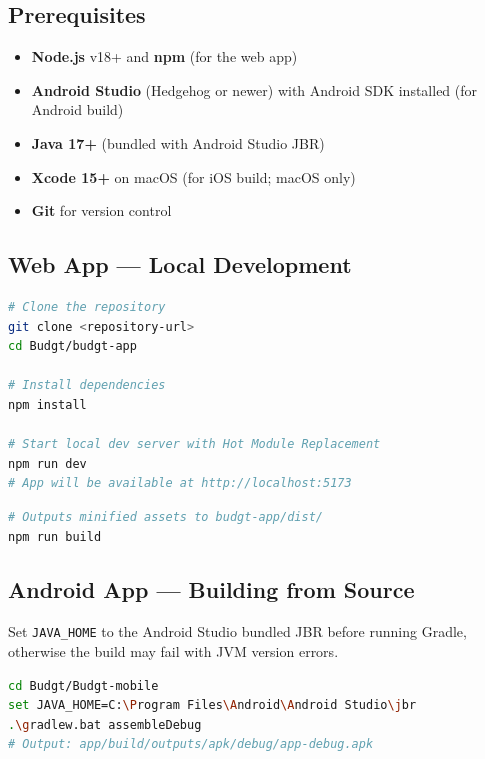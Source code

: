 \documentclass[12pt, a4paper]{article}
\begin{document}
\subsection{Prerequisites}

\begin{itemize}[leftmargin=1.5em]
  \item \textbf{Node.js} v18+ and \textbf{npm} (for the web app)
  \item \textbf{Android Studio} (Hedgehog or newer) with Android SDK installed (for Android build)
  \item \textbf{Java 17+} (bundled with Android Studio JBR)
  \item \textbf{Xcode 15+} on macOS (for iOS build; macOS only)
  \item \textbf{Git} for version control
\end{itemize}

\subsection{Web App --- Local Development}

\begin{lstlisting}[language=bash, caption={Starting the Vite Dev Server}]
# Clone the repository
git clone <repository-url>
cd Budgt/budgt-app

# Install dependencies
npm install

# Start local dev server with Hot Module Replacement
npm run dev
# App will be available at http://localhost:5173
\end{lstlisting}

\begin{lstlisting}[language=bash, caption={Building a Production Bundle}]
# Outputs minified assets to budgt-app/dist/
npm run build
\end{lstlisting}

\subsection{Android App --- Building from Source}

\begin{warnbox}
Set \texttt{JAVA\_HOME} to the Android Studio bundled JBR before running Gradle, otherwise the build may fail with JVM version errors.
\end{warnbox}

\begin{lstlisting}[language=bash, caption={Building the Android APK (Windows)}]
cd Budgt/Budgt-mobile
set JAVA_HOME=C:\Program Files\Android\Android Studio\jbr
.\gradlew.bat assembleDebug
# Output: app/build/outputs/apk/debug/app-debug.apk
\end{lstlisting}
\end{document}
